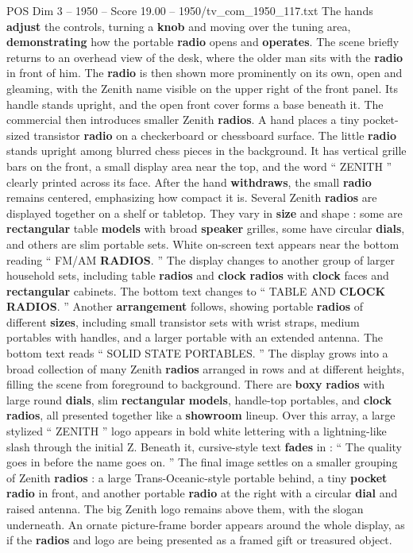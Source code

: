\begin{textsample}{POS Dim 3 – 1950 – Score 19.00 – 1950/tv\_com\_1950\_117.txt}
The hands \textbf{adjust} the controls, turning a \textbf{knob} and moving over the tuning area, \textbf{demonstrating} how the portable \textbf{radio} opens and \textbf{operates}.
The scene briefly returns to an overhead view of the desk, where the older man sits with the \textbf{radio} in front of him.
The \textbf{radio} is then shown more prominently on its own, open and gleaming, with the Zenith name visible on the upper right of the front panel.
Its handle stands upright, and the open front cover forms a base beneath it.
The commercial then introduces smaller Zenith \textbf{radios}.
A hand places a tiny pocket-sized transistor \textbf{radio} on a checkerboard or chessboard surface.
The little \textbf{radio} stands upright among blurred chess pieces in the background.
It has vertical grille bars on the front, a small display area near the top, and the word “ ZENITH ” clearly printed across its face.
After the hand \textbf{withdraws}, the small \textbf{radio} remains centered, emphasizing how compact it is.
Several Zenith \textbf{radios} are displayed together on a shelf or tabletop.
They vary in \textbf{size} and shape : some are \textbf{rectangular} table \textbf{models} with broad \textbf{speaker} grilles, some have circular \textbf{dials}, and others are slim portable sets.
White on-screen text appears near the bottom reading “ FM/AM \textbf{RADIOS}. ” The display changes to another group of larger household sets, including table \textbf{radios} and \textbf{clock} \textbf{radios} with \textbf{clock} faces and \textbf{rectangular} cabinets.
The bottom text changes to “ TABLE AND \textbf{CLOCK} \textbf{RADIOS}. ” Another \textbf{arrangement} follows, showing portable \textbf{radios} of different \textbf{sizes}, including small transistor sets with wrist straps, medium portables with handles, and a larger portable with an extended antenna.
The bottom text reads “ SOLID STATE PORTABLES. ” The display grows into a broad collection of many Zenith \textbf{radios} arranged in rows and at different heights, filling the scene from foreground to background.
There are \textbf{boxy} \textbf{radios} with large round \textbf{dials}, slim \textbf{rectangular} \textbf{models}, handle-top portables, and \textbf{clock} \textbf{radios}, all presented together like a \textbf{showroom} lineup.
Over this array, a large stylized “ ZENITH ” logo appears in bold white lettering with a lightning-like slash through the initial Z.
Beneath it, cursive-style text \textbf{fades} in : “ The quality goes in before the name goes on. ” The final image settles on a smaller grouping of Zenith \textbf{radios} : a large Trans-Oceanic-style portable behind, a tiny \textbf{pocket} \textbf{radio} in front, and another portable \textbf{radio} at the right with a circular \textbf{dial} and raised antenna.
The big Zenith logo remains above them, with the slogan underneath.
An ornate picture-frame border appears around the whole display, as if the \textbf{radios} and logo are being presented as a framed gift or treasured object.

\end{textsample}
